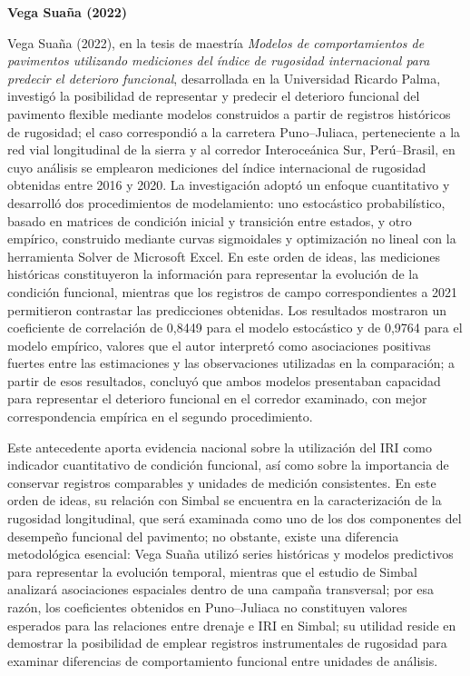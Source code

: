 \noindent\textbf{Vega Suaña (2022)}

Vega Suaña (2022), en la tesis de maestría \textit{Modelos de comportamientos de pavimentos utilizando mediciones del índice de rugosidad internacional para predecir el deterioro funcional}, desarrollada en la Universidad Ricardo Palma, investigó la posibilidad de representar y predecir el deterioro funcional del pavimento flexible mediante modelos construidos a partir de registros históricos de rugosidad; el caso correspondió a la carretera Puno–Juliaca, perteneciente a la red vial longitudinal de la sierra y al corredor Interoceánica Sur, Perú–Brasil, en cuyo análisis se emplearon mediciones del índice internacional de rugosidad obtenidas entre 2016 y 2020. La investigación adoptó un enfoque cuantitativo y desarrolló dos procedimientos de modelamiento: uno estocástico probabilístico, basado en matrices de condición inicial y transición entre estados, y otro empírico, construido mediante curvas sigmoidales y optimización no lineal con la herramienta Solver de Microsoft Excel. En este orden de ideas, las mediciones históricas constituyeron la información para representar la evolución de la condición funcional, mientras que los registros de campo correspondientes a 2021 permitieron contrastar las predicciones obtenidas. Los resultados mostraron un coeficiente de correlación de 0,8449 para el modelo estocástico y de 0,9764 para el modelo empírico, valores que el autor interpretó como asociaciones positivas fuertes entre las estimaciones y las observaciones utilizadas en la comparación; a partir de esos resultados, concluyó que ambos modelos presentaban capacidad para representar el deterioro funcional en el corredor examinado, con mejor correspondencia empírica en el segundo procedimiento.

Este antecedente aporta evidencia nacional sobre la utilización del IRI como indicador cuantitativo de condición funcional, así como sobre la importancia de conservar registros comparables y unidades de medición consistentes. En este orden de ideas, su relación con Simbal se encuentra en la caracterización de la rugosidad longitudinal, que será examinada como uno de los dos componentes del desempeño funcional del pavimento; no obstante, existe una diferencia metodológica esencial: Vega Suaña utilizó series históricas y modelos predictivos para representar la evolución temporal, mientras que el estudio de Simbal analizará asociaciones espaciales dentro de una campaña transversal; por esa razón, los coeficientes obtenidos en Puno–Juliaca no constituyen valores esperados para las relaciones entre drenaje e IRI en Simbal; su utilidad reside en demostrar la posibilidad de emplear registros instrumentales de rugosidad para examinar diferencias de comportamiento funcional entre unidades de análisis.

